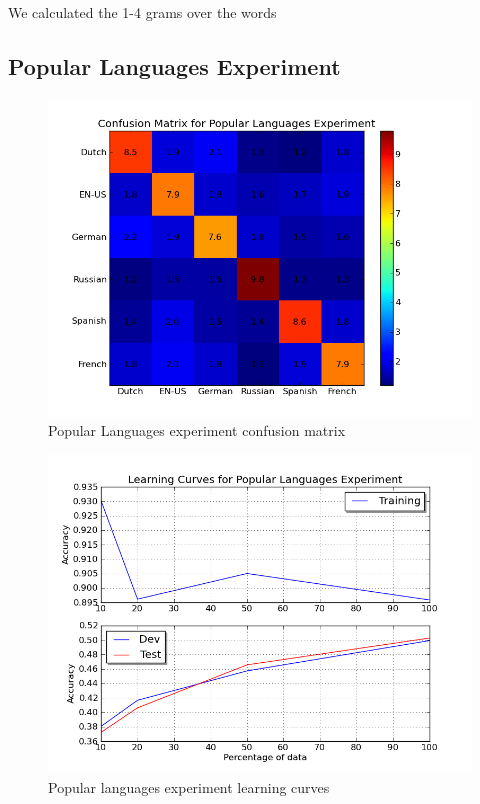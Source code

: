 \documentclass[11pt]{article}
\begin{document}
We calculated the 1-4 grams over the words


\subsection{Popular Languages Experiment}

\begin{figure}[htp]
\centering
\includegraphics[scale=0.45]{popular_cfm.png}
\caption{Popular Languages experiment confusion matrix}
\label{pop_cfm}
\end{figure}

\begin{figure}[htp]
\centering
\includegraphics[scale=0.45]{popular_lc.png}
\caption{Popular languages experiment learning curves}
\label{pop_lc}
\end{figure}
		
\end{document}
